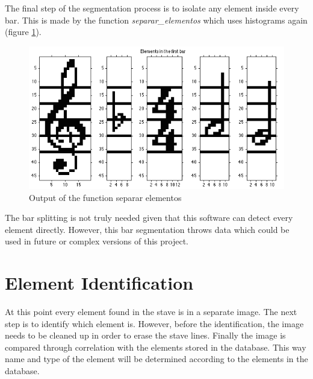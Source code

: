 \documentclass[10pt, a4paper]{article}
\begin{document}
The final step of the segmentation process is to isolate any element inside every bar. This is made by the function \emph{separar\_elementos} which uses histograms again (figure \ref{fig3}). 

\begin{figure}[h!]
  \centering
    \includegraphics[scale=0.25]{./img/img3.png}
  \caption{Output of the function separar elementos}
  \label{fig3}
\end{figure}

The bar splitting is not truly needed given that this software can detect every element directly. However, this bar segmentation throws data which could be used in future or complex versions of this project.

\section{Element Identification}

At this point every element found in the stave is in a separate image. The next step is to identify which element is. However, before the identification, the image needs to be cleaned up in order to erase the stave lines. Finally the image is compared through correlation with the elements stored in the database. This way name and type of the element will be determined according to the elements in the database.
\end{document}
